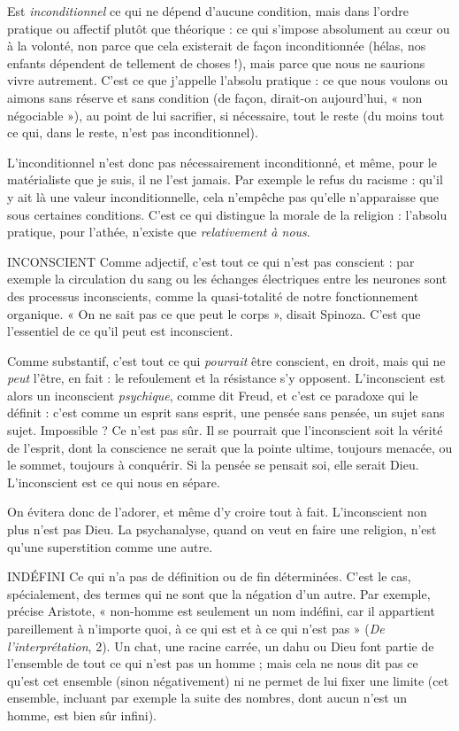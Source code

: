 Est {\it inconditionnel} ce qui ne dépend d’aucune condition, mais dans l’ordre
pratique ou affectif plutôt que théorique : ce qui s'impose absolument au cœur
ou à la volonté, non parce que cela existerait de façon inconditionnée (hélas,
nos enfants dépendent de tellement de choses !), mais parce que nous ne saurions
vivre autrement. C’est ce que j'appelle l’absolu pratique : ce que nous
voulons ou aimons sans réserve et sans condition (de façon, dirait-on
aujourd’hui, « non négociable »), au point de lui sacrifier, si nécessaire, tout le
reste (du moins tout ce qui, dans le reste, n’est pas inconditionnel).

L’inconditionnel n’est donc pas nécessairement inconditionné, et même,
pour le matérialiste que je suis, il ne l’est jamais. Par exemple le refus du
racisme : qu'il y ait là une valeur inconditionnelle, cela n'empêche pas qu’elle
n’apparaisse que sous certaines conditions. C’est ce qui distingue la morale de
la religion : l’absolu pratique, pour l’athée, n'existe que {\it relativement à nous}.

INCONSCIENT Comme adjectif, c’est tout ce qui n’est pas conscient : par
exemple la circulation du sang ou les échanges électriques
entre les neurones sont des processus inconscients, comme la quasi-totalité de
notre fonctionnement organique. « On ne sait pas ce que peut le corps », disait
Spinoza. C’est que l’essentiel de ce qu’il peut est inconscient.

Comme substantif, c’est tout ce qui {\it pourrait} être conscient, en droit, mais
qui ne {\it peut} l'être, en fait : le refoulement et la résistance s’y opposent. L’inconscient
est alors un inconscient {\it psychique}, comme dit Freud, et c’est ce paradoxe
qui le définit : c’est comme un esprit sans esprit, une pensée sans pensée, un
sujet sans sujet. Impossible ? Ce n’est pas sûr. Il se pourrait que l’inconscient
soit la vérité de l'esprit, dont la conscience ne serait que la pointe ultime, toujours
menacée, ou le sommet, toujours à conquérir. Si la pensée se pensait soi,
elle serait Dieu. L’inconscient est ce qui nous en sépare.

On évitera donc de l’adorer, et même d’y croire tout à fait. L’inconscient
non plus n’est pas Dieu. La psychanalyse, quand on veut en faire une religion,
n’est qu’une superstition comme une autre.

INDÉFINI Ce qui n’a pas de définition ou de fin déterminées. C’est le cas,
spécialement, des termes qui ne sont que la négation d’un autre.
Par exemple, précise Aristote, « non-homme est seulement un nom indéfini,
car il appartient pareillement à n'importe quoi, à ce qui est et à ce qui n'est
pas » ({\it De l'interprétation}, 2). Un chat, une racine carrée, un dahu ou Dieu font
partie de l’ensemble de tout ce qui n’est pas un homme ; mais cela ne nous dit
pas ce qu'est cet ensemble (sinon négativement) ni ne permet de lui fixer une
limite (cet ensemble, incluant par exemple la suite des nombres, dont aucun
n’est un homme, est bien sûr infini).


